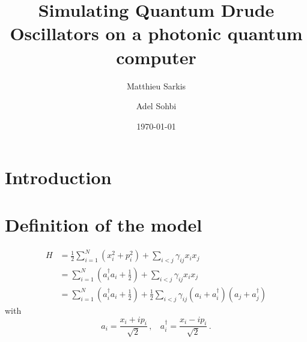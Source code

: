 \documentclass[reprint, amsmath, amssymb, aps]{revtex4-2}
\begin{document}
\preprint{}

\title{Simulating Quantum Drude Oscillators on a photonic quantum computer}

\author{Matthieu Sarkis}


\author{Adel Sohbi}



\date{\today}

\begin{abstract}
\end{abstract}

\maketitle


\section{Introduction}


\section{Definition of the model}

    \begin{equation}
        \label{eq:hamiltonian_N_qdos}
        \begin{split}
            H &= \frac{1}{2}\sum_{i=1}^N\left(x_i^2+p_i^2\right) + \sum_{i<j}\gamma_{ij}x_ix_j\\
            &= \sum_{i=1}^N\left(a_i^\dagger a_i+\frac{1}{2}\right) + \sum_{i<j}\gamma_{ij}x_ix_j\\
            &= \sum_{i=1}^N\left(a_i^\dagger a_i+\frac{1}{2}\right) + \frac{1}{2}\sum_{i<j}\gamma_{ij}\left(a_i+a_i^\dagger\right)\left(a_j+a_j^\dagger\right)
        \end{split}
    \end{equation}
    with
    \begin{equation}
        a_i = \frac{x_i + ip_i}{\sqrt 2}\,,\ \ \ \ a_i^\dagger = \frac{x_i - ip_i}{\sqrt 2}\,.
    \end{equation}
\end{document}
